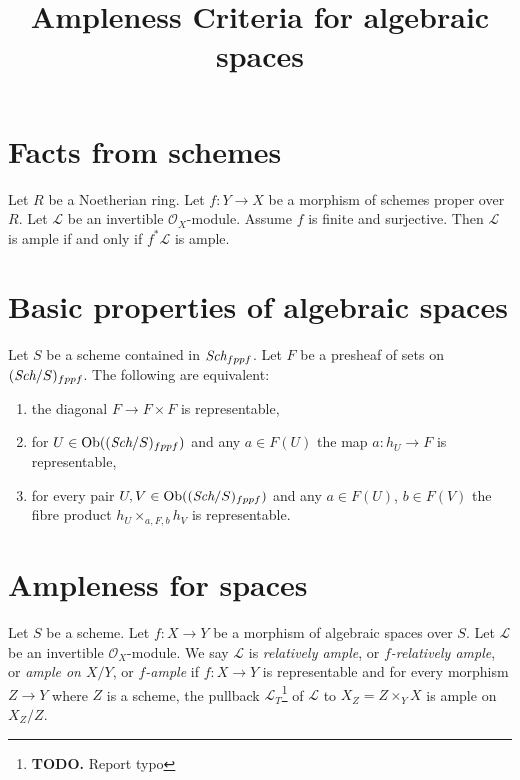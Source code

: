 


\newcommand{\todo}[1]{\footnote{\textbf{TODO.} #1}}

\title{Ampleness Criteria for algebraic spaces}
\maketitle

\section{Facts from schemes}
\begin{lemma}
\label{cohomology-schemes-lemma-surjective-finite-morphism-ample}
Let $R$ be a Noetherian ring. Let $f : Y \to X$ be a morphism of
schemes proper over $R$. Let $\mathcal{L}$ be an
invertible $\mathcal{O}_X$-module. Assume $f$ is finite and surjective.
Then $\mathcal{L}$ is ample if and only if $f^*\mathcal{L}$ is ample.
\end{lemma}

\section{Basic properties of algebraic spaces}

\begin{lemma}
\label{lemma-representable-diagonal}
Let $S$ be a scheme contained in $\textit{Sch}_{fppf}$.
Let $F$ be a presheaf of sets on $(\textit{Sch}/S)_{fppf}$.
The following are equivalent:
\begin{enumerate}
\item the diagonal $F \to F \times F$ is representable,
\item for $U \in \mathop{\rm Ob}\nolimits((\textit{Sch}/S)_{fppf})$ and any $a \in F(U)$
the map $a : h_U \to F$ is representable,
\item for every pair $U, V \in \mathop{\rm Ob}\nolimits((\textit{Sch}/S)_{fppf})$
and any $a \in F(U)$, $b \in F(V)$ the fibre product
$h_U \times_{a, F, b} h_V$ is representable.
\end{enumerate}
\end{lemma}

\section{Ampleness for spaces}
\begin{definition}\label{definition-relatively-ample}
Let $S$ be a scheme.
Let $f : X \to Y$ be a morphism of algebraic spaces over $S$.
Let $\mathcal{L}$ be an invertible $\mathcal{O}_X$-module.
We say $\mathcal{L}$ is {\it relatively ample}, or {\it $f$-relatively ample},
or {\it ample on $X/Y$}, or {\it $f$-ample} if $f : X \to Y$
is representable and for every morphism $Z \to Y$
where $Z$ is a scheme, the pullback $\mathcal{L}_T$\todo{Report typo} of $\mathcal{L}$
to $X_Z = Z \times_Y X$ is ample on $X_Z/Z$.
\end{definition}


